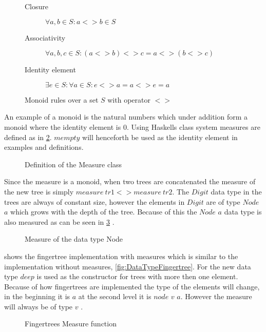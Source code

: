 \begin{figure}[h!]
\begin{description}
\item[Closure] $\forall a,b \in S: a <> b \in S$
\item[Associativity] $\forall a,b,c \in S: (a <> b) <> c = a <> (b <> c)$
\item[Identity element] $\exists e \in S: \forall a \in S: e <> a = a <> e = a$
\end{description}
\caption{Monoid rules over a set $S$ with operator $<>$ \label{fig:monoid}}
\end{figure}

An example of a monoid is the natural numbers which under addition form a monoid
where the identity element is $0$.
Using Haskells class system measures are defined as in \cref{fig:measure}.
$mempty$ will henceforth be used as the identity element in examples and
definitions.

\begin{figure}[h!]

\caption{Definition of the Measure class \label{fig:measure} \cite{fingertree}}
\end{figure}

Since the measure is a monoid, when two trees are concatenated the measure of 
the new tree is simply $measure ~ tr1 <> measure ~ tr2$.
The $Digit$ data type in the trees are always of constant size, however the
elements in $Digit$ are of type $Node$ $a$ which grows with the depth of the tree.
Because of this the $Node$ $a$ data type is also measured as can be seen in
\cref{fig:measureNode} \cite{fingertree}.

\begin{figure}[h!]

\caption{Measure of the data type Node \label{fig:measureNode} \cite{fingertree}}
\end{figure}

 shows the fingertree implementation with measures
which is similar to the implementation without measures,
\cref{fig:DataTypeFingertree}. For the new data type $deep$ is used as the
constructor for trees with more then one element. Because of how fingertrees are
implemented the type of the elements will change, in the beginning it is $a$ at
the second level it is $node$ $v$ $a$. However the measure will always be of
type $v$ \cite{fingertree}.

\begin{figure}[h!]

\caption{Fingertrees Measure function \label{fig:measureFingerTree} \cite{fingertree}}
\end{figure}

